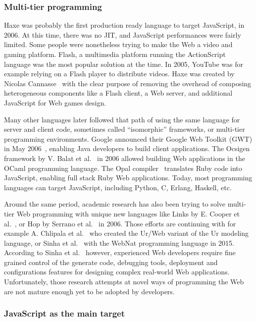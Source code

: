 \subsubsection{Multi-tier programming}%
\label{ssub:multitier}

Haxe was probably the first production ready language to target JavaScript, in 2006.
At this time, there was no JIT, and JavaScript performances were fairly limited.
Some people were nonetheless trying to make the Web a video and gaming platform.
Flash, a multimedia platform running the ActionScript language was the most popular solution at the time.
In 2005, YouTube was for example relying on a Flash player to distribute videos.
Haxe was created by Nicolas Cannasse~\cite{haxe-interview} with the clear purpose
of removing the overhead of composing heterogeneous components like a Flash client,
a Web server, and additional JavaScript for Web games design.

Many other languages later followed that path of using the same language
for server and client code, sometimes called ``isomorphic'' frameworks,
or multi-tier programming environments.
Google announced their Google Web Toolkit (GWT) in May 2006~\cite{gwt},
enabling Java developers to build client applications.
The Ocsigen framework by V. Balat et al.~\cite{balat2006ocsigen} in 2006
allowed building Web applications in the OCaml programming language.
The Opal compiler~\cite{opalrb} translates Ruby code into JavaScript,
enabling full stack Ruby Web applications.
Today, most programming languages can target JavaScript,
including Python, C, Erlang, Haskell, etc.

Around the same period, academic research has also been trying to solve
multi-tier Web programming with unique new languages like Links
by E. Cooper et al.~\cite{cooper2006links},
or Hop by Serrano et al.~\cite{serrano2006hop} in 2006.
Those efforts are continuing with for example
A. Chlipala et al.~\cite{chlipala2015ur} who created the Ur/Web variant
of the Ur modeling language,
or Sinha et al.~\cite{sinha2015simplifying} with the WebNat programming language in 2015.
According to Sinha et al.~\cite{sinha2015simplifying} however,
experienced Web developers require fine grained control of the generate code,
debugging tools, deployment and configurations features
for designing complex real-world Web applications.
Unfortunately, those research attempts at novel ways of programming the Web
are not mature enough yet to be adopted by developers.

\subsubsection{JavaScript as the main target}%
\label{ssub:javascript_as_the_main_target}

